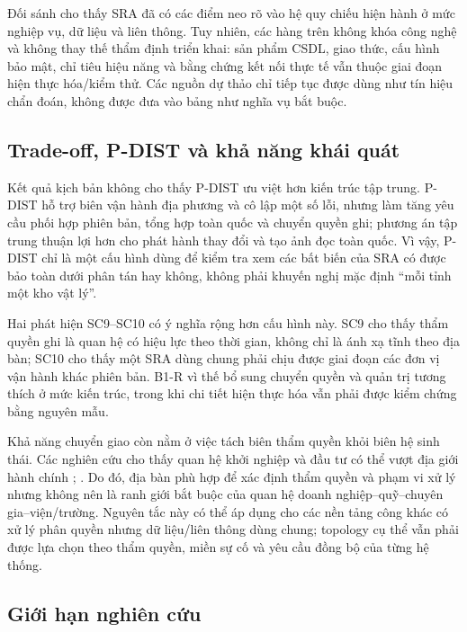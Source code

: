 Đối sánh cho thấy SRA đã có các điểm neo rõ vào hệ quy chiếu hiện hành ở mức nghiệp vụ, dữ liệu và liên thông. Tuy nhiên, các hàng trên không khóa công nghệ và không thay thế thẩm định triển khai: sản phẩm CSDL, giao thức, cấu hình bảo mật, chỉ tiêu hiệu năng và bằng chứng kết nối thực tế vẫn thuộc giai đoạn hiện thực hóa/kiểm thử. Các nguồn dự thảo chỉ tiếp tục được dùng như tín hiệu chẩn đoán, không được đưa vào bảng như nghĩa vụ bắt buộc.

\subsection{Trade-off, P-DIST và khả năng khái quát}
\label{subsec:distributed-discussion}

Kết quả kịch bản không cho thấy P-DIST ưu việt hơn kiến trúc tập trung. P-DIST hỗ trợ biên vận hành địa phương và cô lập một số lỗi, nhưng làm tăng yêu cầu phối hợp phiên bản, tổng hợp toàn quốc và chuyển quyền ghi; phương án tập trung thuận lợi hơn cho phát hành thay đổi và tạo ảnh đọc toàn quốc. Vì vậy, P-DIST chỉ là một cấu hình dùng để kiểm tra xem các bất biến của SRA có được bảo toàn dưới phân tán hay không, không phải khuyến nghị mặc định ``mỗi tỉnh một kho vật lý''.

Hai phát hiện SC9--SC10 có ý nghĩa rộng hơn cấu hình này. SC9 cho thấy thẩm quyền ghi là quan hệ có hiệu lực theo thời gian, không chỉ là ánh xạ tĩnh theo địa bàn; SC10 cho thấy một SRA dùng chung phải chịu được giai đoạn các đơn vị vận hành khác phiên bản. B1-R vì thế bổ sung chuyển quyền và quản trị tương thích ở mức kiến trúc, trong khi chi tiết hiện thực hóa vẫn phải được kiểm chứng bằng nguyên mẫu.

Khả năng chuyển giao còn nằm ở việc tách biên thẩm quyền khỏi biên hệ sinh thái. Các nghiên cứu cho thấy quan hệ khởi nghiệp và đầu tư có thể vượt địa giới hành chính \citep[pp.~28, 32]{fischer2022}; \citep[pp.~1483--1484]{noak2025}. Do đó, địa bàn phù hợp để xác định thẩm quyền và phạm vi xử lý nhưng không nên là ranh giới bắt buộc của quan hệ doanh nghiệp--quỹ--chuyên gia--viện/trường. Nguyên tắc này có thể áp dụng cho các nền tảng công khác có xử lý phân quyền nhưng dữ liệu/liên thông dùng chung; topology cụ thể vẫn phải được lựa chọn theo thẩm quyền, miền sự cố và yêu cầu đồng bộ của từng hệ thống.

\subsection{Giới hạn nghiên cứu}
\label{subsec:limits-transfer}

